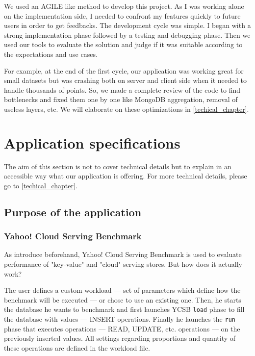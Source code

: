 \documentclass[a4paper,11pt]{report}
\begin{document}
We used an AGILE like method to develop this project. As I was working alone on the implementation side, I needed to confront my features quickly to future users in order to get feedbacks.
The development cycle was simple. I began with a strong implementation phase followed by a testing and debugging phase. Then we used our tools to evaluate the solution and judge if it was suitable according to the expectations and use cases.

For example, at the end of the first cycle, our application was working great for small datasets but was crashing both on server and client side when it needed to handle thousands of points.
So, we made a complete review of the code to find bottlenecks and fixed them one by one like MongoDB aggregation, removal of useless layers, etc. We will elaborate on these optimizations in \ref{techical_chapter}.

\section{Application specifications}

The aim of this section is not to cover technical details but to explain in an accessible way what our application is offering. For more technical details, please go to \ref{techical_chapter}.

\subsection{Purpose of the application}

\subsubsection{Yahoo! Cloud Serving Benchmark}\label{ycsb}

As introduce beforehand, Yahoo! Cloud Serving Benchmark is used to evaluate performance of "key-value" and "cloud" serving stores. But how does it actually work?

The user defines a custom workload --- set of parameters which define how the benchmark will be executed --- or chose to use an existing one. Then, he starts the database he wants to benchmark and first launches YCSB \texttt{load} phase to fill the database with values --- INSERT operations. Finally he launches the \texttt{run} phase that executes operations --- READ, UPDATE, etc. operations --- on the previously inserted values. All settings regarding proportions and quantity of these operations are defined in the workload file.
\end{document}
